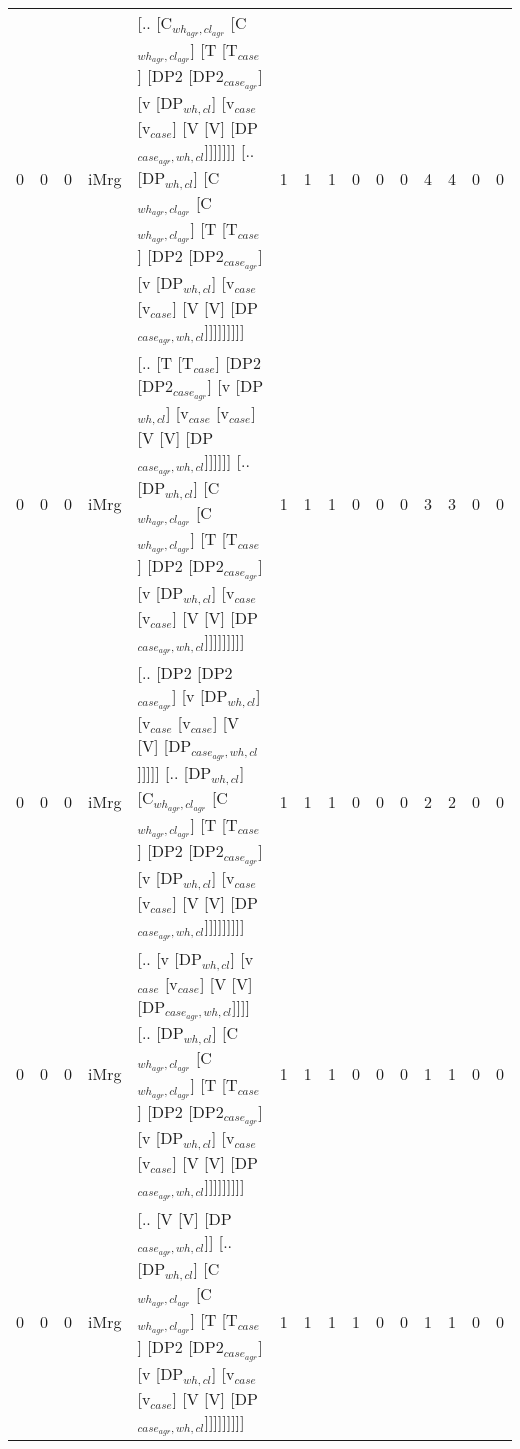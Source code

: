 \begin{tabularx}{\linewidth}{rrrlXrrrrrrrrrr}
   0 &       0 &   0 & iMrg & [.. [C$_{wh_{agr},cl_{agr}}$ [C$_{wh_{agr},cl_{agr}}$] [T [T$_{case}$] [DP2 [DP2$_{case_{agr}}$] [v [DP$_{wh,cl}$] [v$_{case}$ [v$_{case}$] [V [V] [DP$_{case_{agr},wh,cl}$]]]]]]] [.. [DP$_{wh,cl}$] [C$_{wh_{agr},cl_{agr}}$ [C$_{wh_{agr},cl_{agr}}$] [T [T$_{case}$] [DP2 [DP2$_{case_{agr}}$] [v [DP$_{wh,cl}$] [v$_{case}$ [v$_{case}$] [V [V] [DP$_{case_{agr},wh,cl}$]]]]]]]]] &            1 &             1 &             1 &                  0 &                0 &                0 &           4 &           4 &                0 &              0 \\
   0 &       0 &   0 & iMrg & [.. [T [T$_{case}$] [DP2 [DP2$_{case_{agr}}$] [v [DP$_{wh,cl}$] [v$_{case}$ [v$_{case}$] [V [V] [DP$_{case_{agr},wh,cl}$]]]]]] [.. [DP$_{wh,cl}$] [C$_{wh_{agr},cl_{agr}}$ [C$_{wh_{agr},cl_{agr}}$] [T [T$_{case}$] [DP2 [DP2$_{case_{agr}}$] [v [DP$_{wh,cl}$] [v$_{case}$ [v$_{case}$] [V [V] [DP$_{case_{agr},wh,cl}$]]]]]]]]]                                     &            1 &             1 &             1 &                  0 &                0 &                0 &           3 &           3 &                0 &              0 \\
   0 &       0 &   0 & iMrg & [.. [DP2 [DP2$_{case_{agr}}$] [v [DP$_{wh,cl}$] [v$_{case}$ [v$_{case}$] [V [V] [DP$_{case_{agr},wh,cl}$]]]]] [.. [DP$_{wh,cl}$] [C$_{wh_{agr},cl_{agr}}$ [C$_{wh_{agr},cl_{agr}}$] [T [T$_{case}$] [DP2 [DP2$_{case_{agr}}$] [v [DP$_{wh,cl}$] [v$_{case}$ [v$_{case}$] [V [V] [DP$_{case_{agr},wh,cl}$]]]]]]]]]                                                  &            1 &             1 &             1 &                  0 &                0 &                0 &           2 &           2 &                0 &              0 \\
   0 &       0 &   0 & iMrg & [.. [v [DP$_{wh,cl}$] [v$_{case}$ [v$_{case}$] [V [V] [DP$_{case_{agr},wh,cl}$]]]] [.. [DP$_{wh,cl}$] [C$_{wh_{agr},cl_{agr}}$ [C$_{wh_{agr},cl_{agr}}$] [T [T$_{case}$] [DP2 [DP2$_{case_{agr}}$] [v [DP$_{wh,cl}$] [v$_{case}$ [v$_{case}$] [V [V] [DP$_{case_{agr},wh,cl}$]]]]]]]]]                                                                       &            1 &             1 &             1 &                  0 &                0 &                0 &           1 &           1 &                0 &              0 \\
   0 &       0 &   0 & iMrg & [.. [V [V] [DP$_{case_{agr},wh,cl}$]] [.. [DP$_{wh,cl}$] [C$_{wh_{agr},cl_{agr}}$ [C$_{wh_{agr},cl_{agr}}$] [T [T$_{case}$] [DP2 [DP2$_{case_{agr}}$] [v [DP$_{wh,cl}$] [v$_{case}$ [v$_{case}$] [V [V] [DP$_{case_{agr},wh,cl}$]]]]]]]]]                                                                                                        &            1 &             1 &             1 &                  1 &                0 &                0 &           1 &           1 &                0 &              0 \\

\end{tabularx}
